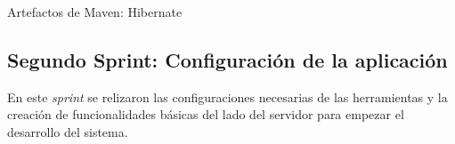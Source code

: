 \begin{enumerate}
\begin{itemize}
\begin{table}[h!]
                \caption{Artefactos de Maven: Hibernate}
                \label{artefactos-hibernate}
            \end{table}
           
        \end{itemize}
    \end{enumerate}
        
        
    \subsection{Segundo Sprint: Configuración de la aplicación}
    
    En este \textit{sprint} se relizaron las configuraciones necesarias de las herramientas y la creación de funcionalidades básicas del lado del servidor para empezar el desarrollo del sistema.
    
